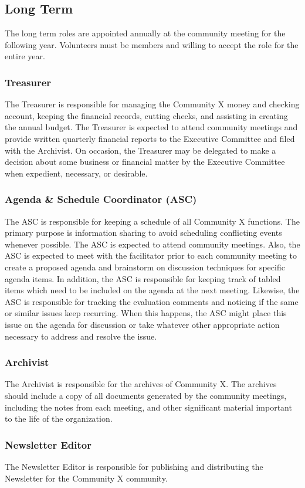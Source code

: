 \subsection*{Long Term}
The long term roles are appointed annually at the community meeting for the following year. Volunteers must be members and willing to accept the role for the entire year.

\subsubsection*{Treasurer}
The Treasurer is responsible for managing the Community X money and checking account, keeping the financial records, cutting checks, and assisting in creating the annual budget. The Treasurer is expected to attend community meetings and provide written quarterly financial reports to the Executive Committee and filed with the Archivist. On occasion, the Treasurer may be delegated to make a decision about some business or financial matter by the Executive Committee when expedient, necessary, or desirable.

\subsubsection*{Agenda \& Schedule Coordinator (ASC)}
The ASC is responsible for keeping a schedule of all Community X functions. The primary purpose is information sharing to avoid scheduling conflicting events whenever possible. The ASC is expected to attend community meetings. Also, the ASC is expected to meet with the facilitator prior to each community meeting to create a proposed agenda and brainstorm on discussion techniques for specific agenda items. In addition, the ASC is responsible for keeping track of tabled items which need to be included on the agenda at the next meeting. Likewise, the ASC is responsible for tracking the evaluation comments and noticing if the same or similar issues keep recurring. When this happens, the ASC might place this issue on the agenda for discussion or take whatever other appropriate action necessary to address and resolve the issue.

\subsubsection*{Archivist}
The Archivist is responsible for the archives of Community X. The archives should include a copy of all documents generated by the community meetings, including the notes from each meeting, and other significant material important to the life of the organization.

\subsubsection*{Newsletter Editor}
The Newsletter Editor is responsible for publishing and distributing the Newsletter for the Community X community.

%